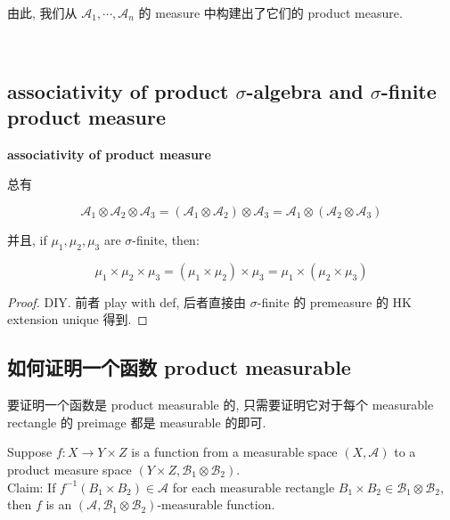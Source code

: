 \documentclass{qlnotes-export}
\begin{document}
由此, 我们从 \(\mathcal{A}_{1},\cdots,\mathcal{A}_{n}\) 的 measure 中构建出了它们的 product measure.\\
\strut \\

\subsection{\texorpdfstring{associativity of product \(\sigma\)-algebra and \(\sigma\)-finite product measure}{associativity of product \textbackslash sigma-algebra and \textbackslash sigma-finite product measure}}\label{associativity-of-product-sigma-algebra-and-sigma-finite-product-measure}

\begin{corollary}{\protect{}\label{kn-associativity-of-product-measure}{\textbf{associativity
of product measure}}}

总有

\[\mathcal{A}_{1} \otimes \mathcal{A}_{2} \otimes \mathcal{A}_{3} = (\mathcal{A}_{1} \otimes \mathcal{A}_{2}) \otimes \mathcal{A}_{3} = \mathcal{A}_{1} \otimes (\mathcal{A}_{2} \otimes \mathcal{A}_{3})\]

并且, if \(\mu_{1},\mu_{2},\mu_{3}\) are \(\sigma\)-finite, then:

\[\mu_{1} \times \mu_{2} \times \mu_{3} = (\mu_{1} \times \mu_{2}) \times \mu_{3} = \mu_{1} \times (\mu_{2} \times \mu_{3})\]

\end{corollary}

\begin{proof}

DIY. 前者 play with def, 后者直接由 \(\sigma\)-finite 的 premeasure 的 HK extension unique 得到.

\end{proof}

\subsection{如何证明一个函数 product measurable}\label{ux5982ux4f55ux8bc1ux660eux4e00ux4e2aux51fdux6570-product-measurable}

要证明一个函数是 product measurable 的, 只需要证明它对于每个 measurable rectangle 的 preimage 都是 measurable 的即可.

\begin{lemma}

Suppose \(f:X\rightarrow Y \times Z\) is a function from a measurable space \((X,\mathcal{A})\) to a product measure space \((Y \times Z,\mathcal{B}_{1} \otimes \mathcal{B}_{2})\).\\
Claim: If \(f^{- 1}(B_{1} \times B_{2}) \in \mathcal{A}\) for each measurable rectangle \(B_{1} \times B_{2} \in \mathcal{B}_{1} \otimes \mathcal{B}_{2}\), then \(f\) is an \((\mathcal{A},\mathcal{B}_{1} \otimes \mathcal{B}_{2})\)-measurable function.

\end{lemma}
\end{document}
